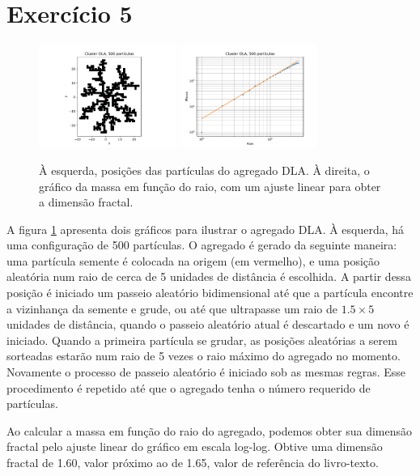 \documentclass[a4paper, brazil]{article}
\begin{document}
\newpage
\section{Exercício 5}

\begin{figure}[ht]
\centering
\includegraphics[width=0.4\textwidth]{fig_5a.pdf}
\includegraphics[width=0.4\textwidth]{fig_5b.pdf}
\caption{À esquerda, posições das partículas do agregado DLA. À direita, o gráfico da massa em função do raio, com um ajuste linear para obter a dimensão fractal.}\label{fig5}
\end{figure}

A figura \ref{fig5} apresenta dois gráficos para ilustrar o agregado DLA.
À esquerda, há uma configuração de 500 partículas.
O agregado é gerado da seguinte maneira: uma partícula semente é colocada na origem (em vermelho), e uma posição aleatória num raio de cerca de 5 unidades de distância é escolhida.
A partir dessa posição é iniciado um passeio aleatório bidimensional até que a partícula encontre a vizinhança da semente e grude, ou até que ultrapasse um raio de \( \num{1.5} \times 5 \) unidades de distância, quando o passeio aleatório atual é descartado e um novo é iniciado.
Quando a primeira partícula se grudar, as posições aleatórias a serem sorteadas estarão num raio de 5 vezes o raio máximo do agregado no momento.
Novamente o processo de passeio aleatório é iniciado sob as mesmas regras.
Esse procedimento é repetido até que o agregado tenha o número requerido de partículas.

Ao calcular a massa em função do raio do agregado, podemos obter sua dimensão fractal pelo ajuste linear do gráfico em escala log-log.
Obtive uma dimensão fractal de \num{1.60}, valor próximo ao de \num{1.65}, valor de referência do livro-texto.
\end{document}
